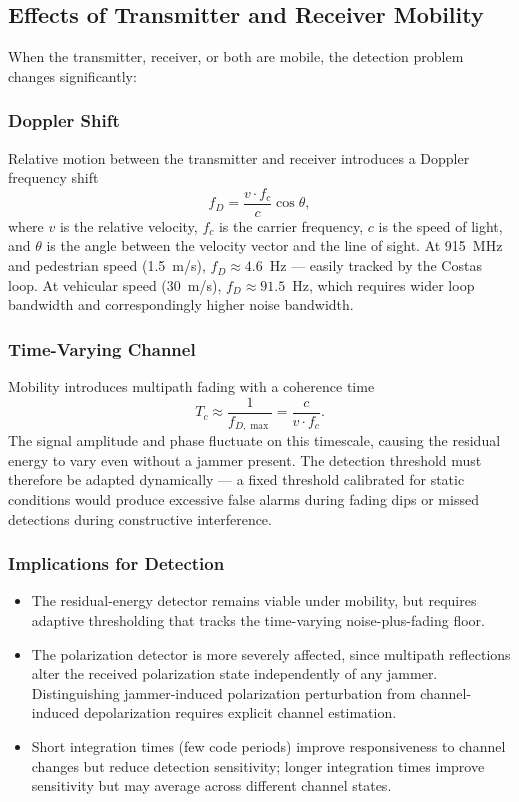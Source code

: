 \documentclass{article}
\begin{document}
\subsection{Effects of Transmitter and Receiver Mobility}

When the transmitter, receiver, or both are mobile, the detection problem changes significantly:

\subsubsection{Doppler Shift}

Relative motion between the transmitter and receiver introduces a Doppler frequency shift
\begin{equation}
f_D = \frac{v \cdot f_c}{c} \cos\theta,
\end{equation}
where $v$ is the relative velocity, $f_c$ is the carrier frequency, $c$ is the speed of light, and $\theta$ is the angle between the velocity vector and the line of sight. At 915~MHz and pedestrian speed (1.5~m/s), $f_D \approx 4.6$~Hz — easily tracked by the Costas loop. At vehicular speed (30~m/s), $f_D \approx 91.5$~Hz, which requires wider loop bandwidth and correspondingly higher noise bandwidth.

\subsubsection{Time-Varying Channel}

Mobility introduces multipath fading with a coherence time
\begin{equation}
T_c \approx \frac{1}{f_{D,\max}} = \frac{c}{v \cdot f_c}.
\end{equation}
The signal amplitude and phase fluctuate on this timescale, causing the residual energy to vary even without a jammer present. The detection threshold must therefore be adapted dynamically — a fixed threshold calibrated for static conditions would produce excessive false alarms during fading dips or missed detections during constructive interference.

\subsubsection{Implications for Detection}

\begin{itemize}
\item The residual-energy detector remains viable under mobility, but requires adaptive thresholding that tracks the time-varying noise-plus-fading floor.
\item The polarization detector is more severely affected, since multipath reflections alter the received polarization state independently of any jammer. Distinguishing jammer-induced polarization perturbation from channel-induced depolarization requires explicit channel estimation.
\item Short integration times (few code periods) improve responsiveness to channel changes but reduce detection sensitivity; longer integration times improve sensitivity but may average across different channel states.
\end{itemize}
\end{document}
